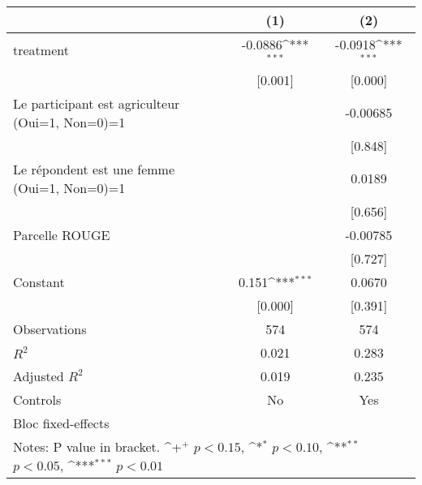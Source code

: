 {
\def\sym#1{\ifmmode^{#1}\else\(^{#1}\)\fi}
\begin{tabular*}{1.2\hsize}{@{\hskip\tabcolsep\extracolsep\fill}l*{2}{c}}
\hline\hline
     &\multicolumn{1}{c}{(1)}         &\multicolumn{1}{c}{(2)}         \\
\hline
treatment&-0.0886\sym{***}&-0.0918\sym{***}\\
     &[0.001]         &[0.000]         \\
[1em]
Le participant est agriculteur (Oui=1, Non=0)=1&           &-0.00685         \\
     &           &[0.848]         \\
[1em]
Le répondent est une femme (Oui=1, Non=0)=1&           &0.0189         \\
     &           &[0.656]         \\
[1em]
Parcelle ROUGE&           &-0.00785         \\
     &           &[0.727]         \\
[1em]
Constant&0.151\sym{***}&0.0670         \\
     &[0.000]         &[0.391]         \\
\hline
Observations&574         &574         \\
\(R^{2}\)&0.021         &0.283         \\
Adjusted \(R^{2}\)&0.019         &0.235         \\
Controls&No         &Yes         \\
Bloc fixed-effects&           &           \\
\hline\hline
\multicolumn{3}{p{1.0\textwidth}}{\footnotesize Notes: P value in bracket. \sym{+} \(p<0.15\), \sym{*} \(p<0.10\), \sym{**} \(p<0.05\), \sym{***} \(p<0.01\)}\\
\end{tabular*}
}
